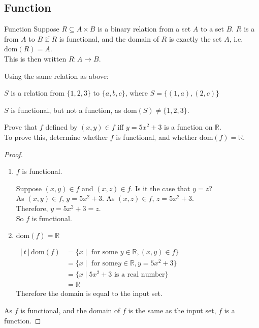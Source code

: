 \documentclass[../notes.tex]{subfiles}
\begin{document}
			\subsection{Function}
				\begin{definition}{Function}
					Suppose $R \subseteq A \times B$ is a binary relation from a set $A$ to a set $B$. $R$ is a  from $A$ to $B$ if $R$ is functional, and the domain of $R$ is exactly the set $A$, i.e. $\mathrm{dom}(R) = A$.\\
					This is then written $R: A \rightarrow B$.
				\end{definition}
				\begin{example}
					Using the same relation as above:
						\begin{indentparagraph}
							$S$ is a relation from $\{1, 2, 3\}$ to $\{a, b, c\}$, where $S = \bigl\{(1, a), (2, c)\bigr\}$
						\end{indentparagraph}
						$S$ is functional, but not a function, as $\mathrm{dom}(S) \neq \{1, 2, 3\}$.
				\end{example}
				\begin{example}
					Prove that $f$ defined by $(x, y) \in f$ iff $y = 5x^{2} + 3$ is a function on $\mathbb{R}$.\\
					To prove this, determine whether $f$ is functional, and whether $\mathrm{dom}(f) = \mathbb{R}$.
					\begin{proof}
						$ $
						\begin{enumerate}[label=(\roman*)]
							\item $f$ is functional.
								\begin{subproof}
									Suppose $(x, y) \in f$ and $(x, z) \in f$. Is it the case that $y = z$?\\
									As $(x, y) \in f$, $y = 5x^{2} + 3$. As $(x, z) \in f$, $z = 5x^{2} + 3$.\\
									Therefore, $y = 5x^{2} + 3 = z$.\\
									So $f$ is functional. 
								\end{subproof}
							\item $\mathrm{dom}(f) = \mathbb{R}$
								\begin{subproof} $
									\begin{aligned}[t]
										\mathrm{dom}(f) &= \{x \mid \text{ for some } y \in \mathbb{R}, (x, y) \in f\}\\
										&= \{x \mid \text{ for some} y \in \mathbb{R}, y = 5x^{2} + 3\}\\
										&= \{x \mid 5x^{2} + 3 \text{ is a real number}\}\\
										&= \mathbb{R}
									\end{aligned} $\\
									Therefore the domain is equal to the input set.
								\end{subproof}
						\end{enumerate}
						As $f$ is functional, and the domain of $f$ is the same as the input set, $f$ is a function.
					\end{proof}
				\end{example}
\end{document}
